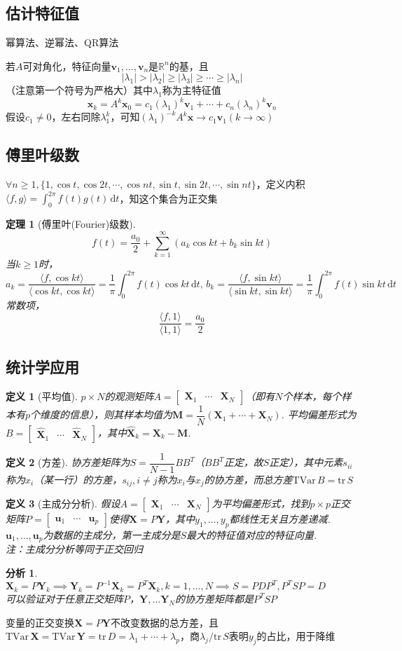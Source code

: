 \documentclass[11pt,UTF8]{ctexart}
\newtheorem{theorem}{定理}
\newtheorem{definition}{定义}
\newtheorem*{analysis}{分析}
\def\vx{\mathbf{x}}
\def\vv{\mathbf{v}}
\def\vu{\mathbf{u}}
\def\dd{\,\mathrm{d}}
\def\rn{\mathbb{R}^n}
\def\tv{\mathrm{TVar}\,}
\def\tr{\mathrm{tr}\,}
\newcommand{\inp}[2]{\langle #1,#2 \rangle}
\newcommand{\vb}[1]{\mathbf{#1}}
\newcommand{\bmat}[2]{\begin{bmatrix}{#1}&\cdots&{#2}\end{bmatrix}}
\begin{document}
\subsection{估计特征值}%
幂算法、逆幂法、QR算法
\par 若$A$可对角化，特征向量$\vv_1,\dots,\vv_n$是$\rn$的基，且
\[|\lambda_1|>|\lambda_2|\geq|\lambda_3|\geq\cdots\geq|\lambda_n|\]
（注意第一个符号为严格大）其中$\lambda_1$称为主特征值
\[\vx_k=A^k\vx_0=c_1(\lambda_1)^k\vv_1+\cdots+c_n(\lambda_n)^k\vv_n\]
假设$c_1\ne 0$，左右同除$\lambda_1^k$，可知$(\lambda_1)^{-k}A^k\vx\to c_1\vv_1(k\to\infty)$

\subsection{傅里叶级数}%
$\forall n\geq 1,\{1,\cos t,\cos 2t,\cdots,\cos nt,\sin t,\sin 2t,\cdots,\sin nt\}$，定义内积$\inp{f}{g}=\displaystyle\int_0^{2\pi} f(t)g(t)\dd t$，知这个集合为正交集
\begin{theorem}[傅里叶(Fourier)级数]
\[f(t)=\dfrac{a_0}{2}+\sum_{k=1}^\infty(a_k\cos kt+b_k\sin kt)\]
当$k\geq 1$时，
\[a_k=\dfrac{\inp{f}{\cos kt}}{\inp{\cos kt}{\cos kt}}=\dfrac{1}{\pi}\int_0^{2\pi}f(t)\cos kt\dd t,\,b_k=\dfrac{\inp{f}{\sin kt}}{\inp{\sin kt}{\sin kt}}=\dfrac{1}{\pi}\int_0^{2\pi}f(t)\sin kt\dd t\]
常数项，
\[\dfrac{\inp{f}{1}}{\inp{1}{1}}=\dfrac{a_0}{2}\]
\end{theorem}

\subsection{统计学应用}%
\begin{definition}[平均值]
$p\times N$的观测矩阵$A=\bmat{\vb{X}_1}{\vb{X}_N}$（即有$N$个样本，每个样本有$p$个维度的信息），则其样本均值为$\vb{M}=\dfrac{1}{N}(\vb{X}_1+\cdots+\vb{X}_N)$. 平均偏差形式为$B=\bmat{\vb{\hat{X}}_1}{\vb{\hat{X}}_N}$，其中$\vb{\hat{X}}_k=\vb{X}_k-\vb{M}$.
\end{definition}
\begin{definition}[方差]
协方差矩阵为$S=\dfrac{1}{N-1}BB^T$（$BB^T$正定，故$S$正定），其中元素$s_{ii}$称为$x_i$（某一行）的方差，$s_{ij},i\ne j$称为$x_i$与$x_j$的协方差，而总方差$\tv B=\tr S$
\end{definition}
\begin{definition}[主成分分析]
假设$A=\bmat{\vb{X}_1}{\vb{X}_N}$为平均偏差形式，找到$p\times p$正交矩阵$P=\bmat{\vu_1}{\vu_p}$使得$\vb{X}=P\vb{Y}$，其中$y_1,\dots,y_p$都线性无关且方差递减. $\vu_1,\dots,\vu_p$为数据的主成分，第一主成分是$S$最大的特征值对应的特征向量.\\
注：主成分分析等同于正交回归
\end{definition}
\begin{analysis}
$\vb{X}_k=P\vb{Y}_k\implies \vb{Y}_k=P^{-1}\vb{X}_k=P^T\vb{X}_k,k=1,\dots,N\implies S=PDP^T, P^TSP=D$\\
可以验证对于任意正交矩阵$P$，$\vb{Y},\dots\vb{Y}_N$的协方差矩阵都是$P^TSP$
\end{analysis}
变量的正交变换$\vb{X}=P\vb{Y}$不改变数据的总方差，且$\tv \vb{X}=\tv \vb{Y}=\tr D=\lambda_1+\cdots+\lambda_p$，商$\lambda_j/\tr S$表明$y_j$的占比，用于降维
\end{document}
